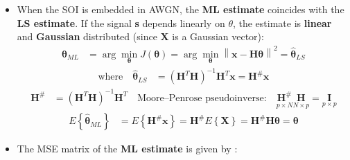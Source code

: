 \begin{itemize}
\begin{align*}
\nabla_{\boldsymbol{\theta}} \ln L(\boldsymbol{\theta})
&= \frac{\partial \ln L(\boldsymbol{\theta})}{\partial \boldsymbol{\theta}}
 = -\frac{1}{2\sigma_W^{2}}
   \frac{\partial}{\partial \boldsymbol{\theta}}
   \left\{ (\mathbf{x} - \mathbf{H}\boldsymbol{\theta})^{T}
           (\mathbf{x} - \mathbf{H}\boldsymbol{\theta}) \right\} \\[4pt]
&= \frac{1}{\sigma_W^{2}}
   \left[ \frac{\partial (\mathbf{H}\boldsymbol{\theta})^{T}}{\partial \boldsymbol{\theta}}
          (\mathbf{x} - \mathbf{H}\boldsymbol{\theta}) \right] \\[4pt]
&= \frac{1}{\sigma_W^{2}}
   \left[ \mathbf{H}^{T}(\mathbf{x} - \mathbf{H}\boldsymbol{\theta}) \right]
   = 0
\end{align*}
\item When the SOI is embedded in AWGN, the \textbf{ML estimate} coincides with the \textbf{LS estimate}. If the signal \textbf{s} depends linearly on \(\theta\), the estimate is \textbf{linear} and \textbf{Gaussian} distributed (since \textbf{X} is a Gaussian vector):
\begin{align*}
\hat{\boldsymbol{\theta}}_{ML}
&= \arg\min_{\boldsymbol{\theta}} J(\boldsymbol{\theta})
 = \arg\min_{\boldsymbol{\theta}}
   \left\| \mathbf{x} - \mathbf{H}\boldsymbol{\theta} \right\|^{2}
 = \hat{\boldsymbol{\theta}}_{LS}
\end{align*}
\vspace{-1.5em}
\begin{align*}
\text{where} \quad
\hat{\boldsymbol{\theta}}_{LS}
&= (\mathbf{H}^{T}\mathbf{H})^{-1}\mathbf{H}^{T}\mathbf{x}
 = \mathbf{H}^{\#}\mathbf{x}
\end{align*}
\vspace{-1.5em}
\begin{align*}
\mathbf{H}^{\#}
&= (\mathbf{H}^{T}\mathbf{H})^{-1}\mathbf{H}^{T}
\quad \text{Moore--Penrose pseudoinverse:} \quad
\underset{p\times N}{\mathbf{H}^{\#}}
\underset{N\times p}{\mathbf{H}}
= \underset{p\times p}{\mathbf{I}}
\end{align*}
\vspace{-1.5em}
\begin{align*}
E\left\{\hat{\boldsymbol{\theta}}_{ML}\right\}
&= E\left\{\mathbf{H}^{\#}\mathbf{x}\right\}
 = \mathbf{H}^{\#} E\left\{\mathbf{X}\right\}
 = \mathbf{H}^{\#}\mathbf{H}\boldsymbol{\theta}
 = \boldsymbol{\theta}
\end{align*}
\item The MSE matrix of the \textbf{ML estimate} is given by :

\end{itemize}
